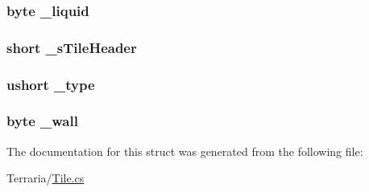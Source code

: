 \subsubsection[{\+\_\+liquid}]{\setlength{\rightskip}{0pt plus 5cm}byte \+\_\+liquid\hspace{0.3cm}{\ttfamily [package]}}\label{structOTA_1_1Memory_1_1TileRef_a177d3b4020f6ac1a853c1bf20c11016e}
\hypertarget{structOTA_1_1Memory_1_1TileRef_a8c4e25f032899f19d00e20d1b442cbf9}{}
\subsubsection[{\+\_\+s\+Tile\+Header}]{\setlength{\rightskip}{0pt plus 5cm}short \+\_\+s\+Tile\+Header\hspace{0.3cm}{\ttfamily [package]}}\label{structOTA_1_1Memory_1_1TileRef_a8c4e25f032899f19d00e20d1b442cbf9}
\hypertarget{structOTA_1_1Memory_1_1TileRef_a20798f220457778ecbdf14011b784217}{}
\subsubsection[{\+\_\+type}]{\setlength{\rightskip}{0pt plus 5cm}ushort \+\_\+type\hspace{0.3cm}{\ttfamily [package]}}\label{structOTA_1_1Memory_1_1TileRef_a20798f220457778ecbdf14011b784217}
\hypertarget{structOTA_1_1Memory_1_1TileRef_a5fe6240cebfe47a956acae69fd5257c0}{}
\subsubsection[{\+\_\+wall}]{\setlength{\rightskip}{0pt plus 5cm}byte \+\_\+wall\hspace{0.3cm}{\ttfamily [package]}}\label{structOTA_1_1Memory_1_1TileRef_a5fe6240cebfe47a956acae69fd5257c0}


The documentation for this struct was generated from the following file\+:\begin{DoxyCompactItemize}
\item 
Terraria/\hyperlink{Tile_8cs}{Tile.\+cs}\end{DoxyCompactItemize}
